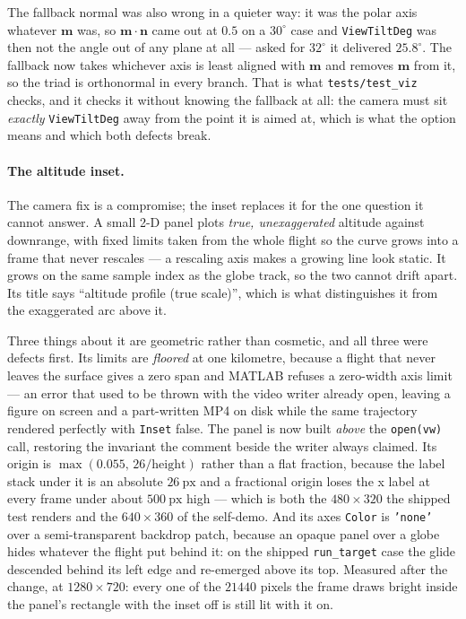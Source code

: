 \documentclass[11pt]{article}
\newcommand{\code}[1]{\texttt{#1}}
\begin{document}
The fallback normal was also wrong in a quieter way: it was the polar axis
whatever $\mathbf{m}$ was, so $\mathbf{m}\cdot\mathbf{n}$ came out at $0.5$ on
a $30^\circ$ case and \code{ViewTiltDeg} was then not the angle out of any
plane at all --- asked for $32^\circ$ it delivered $25.8^\circ$. The fallback
now takes whichever axis is least aligned with $\mathbf{m}$ and removes
$\mathbf{m}$ from it, so the triad is orthonormal in every branch. That is what
\code{tests/test\_viz} checks, and it checks it without knowing the fallback at
all: the camera must sit \emph{exactly} \code{ViewTiltDeg} away from the point
it is aimed at, which is what the option means and which both defects break.

\paragraph{The altitude inset.} The camera fix is a compromise; the inset
replaces it for the one question it cannot answer. A small 2-D panel plots
\emph{true, unexaggerated} altitude against downrange, with fixed limits taken
from the whole flight so the curve grows into a frame that never rescales --- a
rescaling axis makes a growing line look static. It grows on the same sample
index as the globe track, so the two cannot drift apart. Its title says
``altitude profile (true scale)'', which is what distinguishes it from the
exaggerated arc above it.

Three things about it are geometric rather than cosmetic, and all three were
defects first. Its limits are \emph{floored} at one kilometre, because a flight
that never leaves the surface gives a zero span and MATLAB refuses a zero-width
axis limit --- an error that used to be thrown with the video writer already
open, leaving a figure on screen and a part-written MP4 on disk while the same
trajectory rendered perfectly with \code{Inset} false. The panel is now built
\emph{above} the \code{open(vw)} call, restoring the invariant the comment
beside the writer always claimed. Its origin is $\max(0.055,\,26/\mathrm{height})$
rather than a flat fraction, because the label stack under it is an absolute
$26~\mathrm{px}$ and a fractional origin loses the x label at every frame under
about $500~\mathrm{px}$ high --- which is both the $480\times320$ the shipped
test renders and the $640\times360$ of the self-demo. And its axes
\code{Color} is \code{'none'} over a semi-transparent backdrop patch, because an
opaque panel over a globe hides whatever the flight put behind it: on the
shipped \code{run\_target} case the glide descended behind its left edge and
re-emerged above its top. Measured after the change, at $1280\times720$: every
one of the $21440$ pixels the frame draws bright inside the panel's rectangle
with the inset off is still lit with it on.
\end{document}
